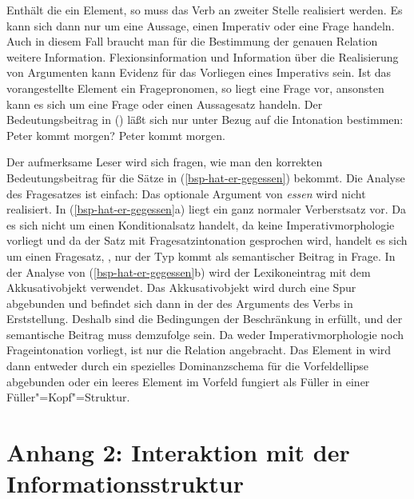 Enthält die \slashl ein Element, so muss das Verb an zweiter Stelle realisiert werden.
Es kann sich dann nur um eine Aussage, einen Imperativ oder eine Frage handeln. Auch in diesem
Fall braucht man für die Bestimmung der genauen Relation weitere Information. Flexionsinformation
und Information über die Realisierung von Argumenten kann Evidenz für das Vorliegen eines
Imperativs sein. Ist das vorangestellte Element ein Fragepronomen, so liegt eine Frage vor,
ansonsten kann es sich um eine Frage oder einen Aussagesatz handeln. Der Bedeutungsbeitrag in ()
läßt sich nur unter Bezug auf die Intonation bestimmen:
\eal
\ex Peter kommt morgen?
\ex Peter kommt morgen.
\zl

\noindent
Der aufmerksame Leser wird sich fragen, wie man den korrekten Bedeutungsbeitrag für die Sätze in
(\ref{bsp-hat-er-gegessen}) bekommt. Die Analyse des Fragesatzes ist einfach: Das optionale Argument
von \emph{essen} wird nicht realisiert. In (\ref{bsp-hat-er-gegessen}a) liegt ein ganz normaler Verberstsatz
vor. Da es sich nicht um einen Konditionalsatz handelt, da keine Imperativmorphologie vorliegt
und da der Satz mit Fragesatzintonation gesprochen wird, handelt es sich um einen Fragesatz,
\dash, nur der Typ  kommt als semantischer Beitrag in Frage. In der Analyse von
(\ref{bsp-hat-er-gegessen}b) wird der Lexikoneintrag mit dem Akkusativobjekt verwendet. Das Akkusativobjekt
wird durch eine Spur abgebunden und befindet sich dann in der \slashl des Arguments des Verbs
in Erststellung. Deshalb sind die Bedingungen der Beschränkung in  erfüllt, und
der semantische Beitrag muss demzufolge  sein.
Da weder Imperativmorphologie noch Frageintonation vorliegt, ist nur die Relation 
angebracht. Das Element in \slasch wird dann entweder durch ein spezielles Dominanzschema für
die Vorfeldellipse abgebunden \citep{Mueller2004e} oder ein leeres Element im Vorfeld fungiert als Füller in einer 
Füller"=Kopf"=Struktur.



\section{Anhang 2: Interaktion mit der Informationsstruktur}
\label{sec-udc-is}

